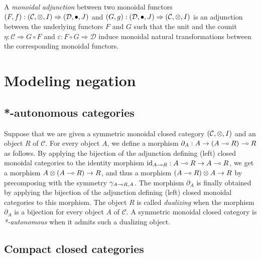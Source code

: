 \begin{definition}
A \emph{monoidal adjunction} between two monoidal functors
$(F,f):(\mathcal{C},\otimes,I)\Rightarrow(\mathcal{D},\bullet,J)$
and
$(G,g):(\mathcal{D},\bullet,J)\Rightarrow(\mathcal{C},\otimes,I)$
is an adjunction between the underlying functors $F$ and $G$ such that the unit and the counit
$\eta:\mathcal{C}\Rightarrow G\circ F$ and $\varepsilon:F\circ G\Rightarrow\mathcal{D}$
induce monoidal natural transformations between the corresponding monoidal functors.
\end{definition}


\section{Modeling negation}\label{modeling-negation}

\subsection{*-autonomous categories}\label{autonomous-categories}

\begin{definition}\label{staraut}
Suppose that we are given a symmetric monoidal closed category $(\mathcal{C},\otimes,I)$ and an object $R$ of $\mathcal{C}$. For every object $A$, we define a morphism $\partial_{A}:A\to(A\multimap R)\multimap R$ as follows. By applying the bijection of the adjunction defining (left) closed monoidal categories to the identity morphism $\mathrm{id}_{A\multimap R}:A\multimap R \to A\multimap R$, we get a morphism $A\otimes (A\multimap R)\to R$, and thus a morphism $(A\multimap R)\otimes A\to R$ by precomposing with the symmetry $\gamma_{A\multimap R,A}$. The morphism $\partial_A$ is finally obtained by applying the bijection of the adjunction defining (left) closed monoidal categories to this morphism. The object $R$ is called \emph{dualizing} when the morphism $\partial_A$ is a bijection for every object $A$ of $\mathcal{C}$. A symmetric monoidal closed category is \emph{*-autonomous} when it admits such a dualizing object.
\end{definition}

\subsection{Compact closed categories}\label{compact-closed-categories}

